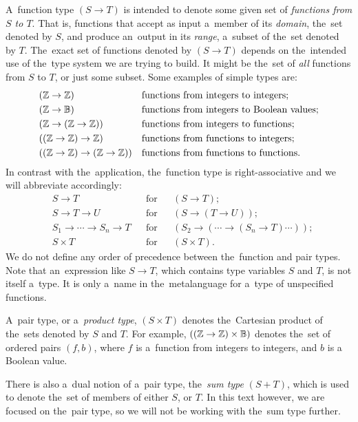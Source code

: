 A~function type $(S \to T)$ is intended to denote some given set of
\emph{functions from $S$ to $T$}. That is, functions that accept as input
a~member of its \emph{domain}, the~set denoted by $S$, and produce an~output in
its \emph{range}, a~subset of the~set denoted by $T$. The~exact set of functions
denoted by $(S \to T)$ depends on the~intended use of the~type system we are
trying to build. It might be the~set of \emph{all} functions from $S$ to $T$, or
just some subset. Some examples of simple types are:
\begin{align*}
  &(\mathbb{Z} \to \mathbb{Z}) && \text{functions from integers to integers;} \\
  &(\mathbb{Z} \to \mathbb{B}) && \text{functions from integers to Boolean values;} \\
  &(\mathbb{Z} \to (\mathbb{Z} \to \mathbb{Z})) && \text{functions from integers to functions;} \\
  &((\mathbb{Z} \to \mathbb{Z}) \to \mathbb{Z}) && \text{functions from functions to integers;} \\
  &((\mathbb{Z} \to \mathbb{Z}) \to (\mathbb{Z} \to \mathbb{Z})) && \text{functions from functions to
    functions.}
\end{align*}
In contrast with the~\lt application, the~function type is right-associative
and we will abbreviate accordingly:
\begin{align*}
  &S \to T  &  &\text{for} &  &(S \to T); \\
  &S \to T \to U  &  &\text{for} &  &(S \to (T \to U)); \\
  &S_1 \to \dotsb \to S_n \to T  &  &\text{for} &
    &(S_2 \to ( \dotsb \to (S_n \to T) \dotsb )); \\
  &S \times T  &  &\text{for} &  &(S \times T).
\end{align*}
We do not define any order of precedence between the~function and pair types.
Note that an~expression like $S \to T$, which contains type variables $S$ and
$T$, is not itself a~type. It is only a~name in the~metalanguage for a~type of
unspecified functions.

A~pair type, or a~\emph{product type}, $(S \times T)$ denotes the~Cartesian
product of the~sets denoted by $S$ and $T$. For example, $((\mathbb{Z} \to \mathbb{Z})
\times \mathbb{B})$ denotes the~set of ordered pairs $(f, b)$, where $f$ is
a~function from integers to integers, and $b$ is a Boolean value.

There is also a~dual notion of a~pair type, the~\emph{sum type} $(S + T)$, which
is used to denote the~set of members of either $S$, or $T$. In this text
however, we are focused on the~pair type, so we will not be working with the~sum
type further.

